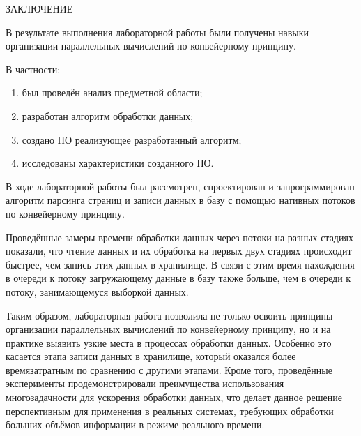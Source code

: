 \begin{center}
    \MakeUppercase{\large Заключение}
\end{center}

В результате выполнения лабораторной работы были получены навыки организации параллельных вычислений по конвейерному принципу.

\vspace{0.25cm}
В частности:

\begin{enumerate}

\item был проведён анализ предметной области;

\item разработан алгоритм обработки данных;

\item создано ПО реализующее разработанный алгоритм;

\item исследованы характеристики созданного ПО.

\end{enumerate}

В ходе лабораторной работы был рассмотрен, спроектирован и запрограммирован алгоритм парсинга страниц и записи данных в базу с помощью нативных потоков по конвейерному принципу.

Проведённые замеры времени обработки данных через потоки на разных стадиях показали, что чтение данных и их обработка на первых двух стадиях происходит быстрее, чем запись этих данных в хранилище. В связи с этим время нахождения в очереди к потоку загружающему данные в базу также больше, чем в очереди к потоку, занимающемуся выборкой данных.

Таким образом, лабораторная работа позволила не только освоить принципы организации параллельных вычислений по конвейерному принципу, но и на практике выявить узкие места в процессах обработки данных. Особенно это касается этапа записи данных в хранилище, который оказался более времязатратным по сравнению с другими этапами. Кроме того, проведённые эксперименты продемонстрировали преимущества использования многозадачности для ускорения обработки данных, что делает данное решение перспективным для применения в реальных системах, требующих обработки больших объёмов информации в режиме реального времени.

\newpage